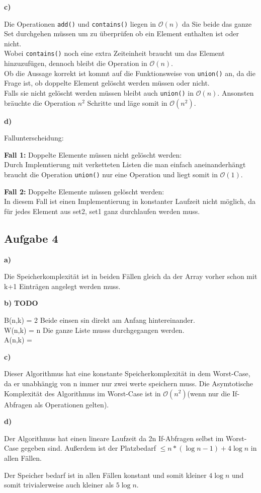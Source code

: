 \documentclass[a4paper,graphics,11pt]{article}
\newcommand{\aufgabe}[1]{\subsection*{Aufgabe #1}}
\begin{document}
\textbf{c)}

Die Operationen \texttt{add()} und \texttt{contains()} liegen in $\mathcal{O}(n)$ da Sie beide das ganze Set durchgehen müssen um zu überprüfen ob ein Element enthalten ist oder nicht.\\
Wobei \texttt{contains()} noch eine extra Zeiteinheit braucht um das Element hinzuzufügen, dennoch bleibt die Operation in $\mathcal{O}(n)$.\\
Ob die Aussage korrekt ist kommt auf die Funktionsweise von \texttt{union()} an, da  die Frage ist, ob doppelte Element gelöscht werden müssen oder nicht.\\
Falls sie nicht gelöscht werden müssen bleibt auch \texttt{union()} in $\mathcal{O}(n)$. Ansonsten bräuchte die Operation $ n^2$ Schritte und läge somit in $\mathcal{O}(n^2)$.

\textbf{d)}

Fallunterscheidung:

\textbf{Fall 1:} Doppelte Elemente müssen nicht gelöscht werden:\\
Durch Implemtierung mit verketteten Listen die man einfach aneinanderhängt braucht die Operation \texttt{union()} nur eine Operation und liegt somit in $\mathcal{O}(1)$.

\textbf{Fall 2:} Doppelte Elemente müssen gelöscht werden:\\
In diesem Fall ist einen Implementierung in konstanter Laufzeit nicht möglich, da für jedes Element aus set2, set1 ganz durchlaufen werden muss.

\newpage

\aufgabe{4}
\textbf{a)}

Die Speicherkomplexität ist in beiden Fällen gleich da der Array vorher schon mit k+1 Einträgen angelegt werden muss.

\textbf{b)}
\textbf{TODO}

B(n,k) = 2  Beide einsen sin direkt am Anfang hintereinander.\\
W(n,k) = n  Die ganze Liste musss durchgegangen werden.\\
A(n,k) = 

\textbf{c)}



Dieser Algorithmus hat eine konstante Speicherkomplexität in dem Worst-Case, da er unabhängig von n immer nur zwei werte speichern muss.
Die Asymtotische Komplexität des Algorithmus im Worst-Case ist in $\mathcal{O}(n^2)$(wenn nur die If-Abfragen als Operationen gelten).

\textbf{d)}


Der Algorithmus hat einen lineare Laufzeit da 2n If-Abfragen selbst im Worst-Case gegeben sind.
Außerdem ist der Platzbedarf $\le n*(\log n-1 )+ 4\log n$ in allen Fällen.

\newpage


Der Speicher bedarf ist in allen Fällen konstant und somit kleiner $4\log n$ und somit trivialerweise auch kleiner als $5\log n$.
\end{document}
